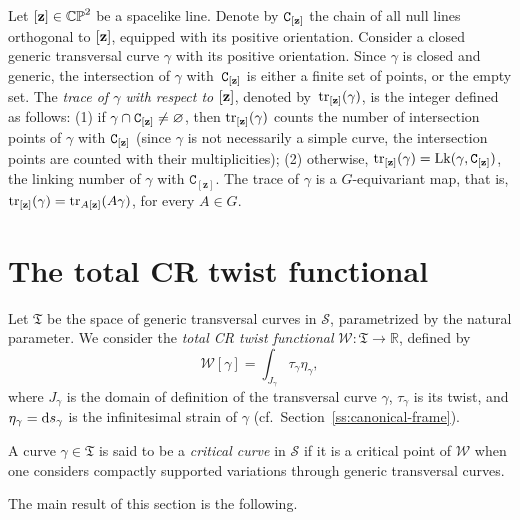 \documentclass[10pt,a4paper]{amsart}
\numberwithin{equation}{section}
\begin{document}
 \begin{Definition}
Let $[{\bf z}]\in \mathbb{CP}^2$ be a spacelike line.
Denote by ${\mathtt C}_{[{\bf z}]}$ the chain of all null lines orthogonal to $[{\bf z}]$, equipped with its positive orientation.
Consider a closed generic transversal curve $\gamma$ with its positive orientation.
Since $\gamma$ is closed and generic, the intersection of $\gamma$ with~${\mathtt C}_{[{\bf z}]}$ is either a finite
set of points, or
the empty set.
The \emph{trace of $\gamma$ with respect to $[{\bf z}]$}, denoted by~${\rm tr}_{[{\mathbf z}]}(\gamma)$,
 is the integer defined as follows: (1) if $\gamma \cap {\mathtt C}_{[{\bf z}]}\neq \varnothing$,
 then ${\rm tr}_{[{\bf z}]}(\gamma)$ counts the number of intersection points of $\gamma$ with ${\mathtt C}_{[{\bf z}]}$
 (since $\gamma$ is not necessarily a simple curve, the intersection points are counted with their multiplicities); (2)
 otherwise, ${\rm tr}_{[{\bf z}]}(\gamma)={\rm Lk}(\gamma, {\mathtt C}_{[{\bf z}]})$, the linking number of
 $\gamma$ with ${\mathtt C}_{[\mathbf{z}]}$. The trace of $\gamma$ is a $G$-equivariant map,
 that is, ${\rm tr}_{[{\bf z}]}(\gamma) = {\rm tr}_{{A}[{\bf z}]}({A}\gamma)$, for every ${A}\in G$.
 \end{Definition}

\section{The total CR twist functional}\label{s:total-twist}

Let $\mathfrak{T}$ be the space of generic transversal curves in $\mathcal{S}$, parametrized by the natural parameter.
We consider the \textit{total CR twist functional} $\mathcal{W} \colon \mathfrak{T} \to \mathbb R$, defined by
\begin{equation*}%
 \mathcal{W}[\gamma] = \int_{J_\gamma} { \tau_\gamma  \eta_\gamma}  ,
 \end{equation*}
where ${J_\gamma}$ is the domain of definition of the transversal curve $\gamma$, $\tau_\gamma$
is its twist, and $\eta_\gamma= {\rm d}s_\gamma$ is the infinitesimal strain of $\gamma$ (cf.\ Section~\ref{ss:canonical-frame}).

A curve $\gamma \in \mathfrak{T}$ is said to be a \textit{critical curve}
in $\mathcal{S}$ if it is a critical point of
$\mathcal{W}$ when one considers compactly
supported variations through generic transversal curves.

The main result of this section is the following.
\end{document}
